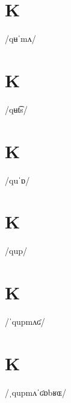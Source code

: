 \documentclass[10pt,a4paper,twoside]{book}
\begin{document}
\section*{K}

\begin{multicols}{3}
 {/qʉˈmʌ/} {}
\end{multicols}

\section*{K}

\begin{multicols}{3}
 {/qʉt͡s/} {}
\end{multicols}

\section*{K}

\begin{multicols}{3}
 {/quˈɒ/} {}
\end{multicols}

\section*{K}

\begin{multicols}{3}
 {/qup/} {}
\end{multicols}

\section*{K}

\begin{multicols}{3}
 {/ˈqupmʌʛ/} {}
\end{multicols}

\section*{K}

\begin{multicols}{3}
 {/ˌqupmʌˈʛɒbʁɶ/} {}
\end{multicols}
\end{document}
